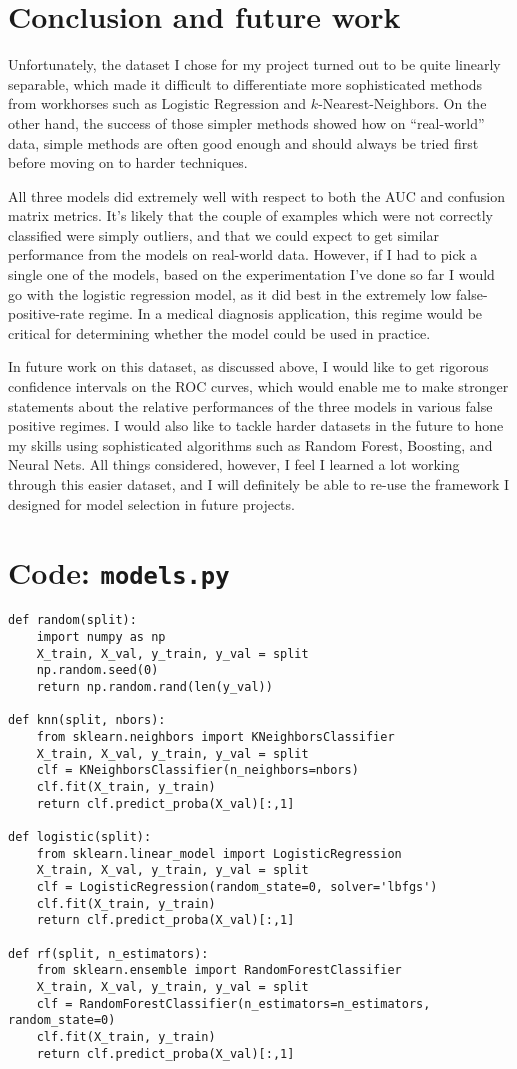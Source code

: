 \documentclass[11pt]{article}
\begin{document}
\section{Conclusion and future work}
Unfortunately, the dataset I chose for my project turned out to be quite linearly separable, which made it difficult to differentiate more sophisticated methods from workhorses such as Logistic Regression and $k$-Nearest-Neighbors. On the other hand, the success of those simpler methods showed how on ``real-world'' data, simple methods are often good enough and should always be tried first before moving on to harder techniques.

All three models did extremely well with respect to both the AUC and confusion matrix metrics. It's likely that the couple of examples which were not correctly classified were simply outliers, and that we could expect to get similar performance from the models on real-world data. However, if I had to pick a single one of the models, based on the experimentation I've done so far I would go with the logistic regression model, as it did best in the extremely low false-positive-rate regime. In a medical diagnosis application, this regime would be critical for determining whether the model could be used in practice.

In future work on this dataset, as discussed above, I would like to get rigorous confidence intervals on the ROC curves, which would enable me to make stronger statements about the relative performances of the three models in various false positive regimes. I would also like to tackle harder datasets in the future to hone my skills using sophisticated algorithms such as Random Forest, Boosting, and Neural Nets. All things considered, however, I feel I learned a lot working through this easier dataset, and I will definitely be able to re-use the framework I designed for model selection in future projects.

\section{Code: \texttt{models.py}}
\begin{verbatim}
def random(split):
    import numpy as np
    X_train, X_val, y_train, y_val = split
    np.random.seed(0)
    return np.random.rand(len(y_val))

def knn(split, nbors):
    from sklearn.neighbors import KNeighborsClassifier
    X_train, X_val, y_train, y_val = split
    clf = KNeighborsClassifier(n_neighbors=nbors)
    clf.fit(X_train, y_train)
    return clf.predict_proba(X_val)[:,1]

def logistic(split):
    from sklearn.linear_model import LogisticRegression
    X_train, X_val, y_train, y_val = split
    clf = LogisticRegression(random_state=0, solver='lbfgs')
    clf.fit(X_train, y_train)
    return clf.predict_proba(X_val)[:,1]

def rf(split, n_estimators):
    from sklearn.ensemble import RandomForestClassifier
    X_train, X_val, y_train, y_val = split
    clf = RandomForestClassifier(n_estimators=n_estimators, random_state=0)
    clf.fit(X_train, y_train)
    return clf.predict_proba(X_val)[:,1]
\end{verbatim}
\end{document}
